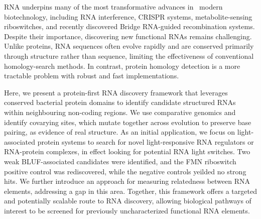 RNA underpins many of the most transformative advances in \ modern biotechnology, including RNA interference, CRISPR systems, metabolite-sensing riboswitches, and recently discovered Bridge RNA-guided recombination systems. 
Despite their importance, discovering new functional RNAs remains challenging. 
Unlike proteins, RNA sequences often evolve rapidly and are conserved primarily through structure rather than sequence, limiting the effectiveness of conventional homology-search methods. 
In contrast, protein homology detection is a more tractable problem with robust and fast implementations.

Here, we present a protein-first RNA discovery framework that leverages conserved bacterial protein domains to identify candidate structured RNAs within neighbouring non-coding regions. 
We use comparative genomics and identify covarying sites, which mutate together across evolution to preserve base pairing, as evidence of real structure. 
As an initial application, we focus on light-associated protein systems to search for novel light-responsive RNA regulators or RNA-protein complexes, in effect looking for potential RNA light switches. 
Two weak BLUF-associated candidates were identified, and the FMN riboswitch positive control was rediscovered, while the negative controls yeilded no strong hits.
We further introduce an approach for measuring relatedness between RNA elements, addressing a gap in this area. 
Together, this framework offers a targeted and potentially scalable route to RNA discovery, allowing biological pathways of interest to be screened for previously uncharacterized functional RNA elements.